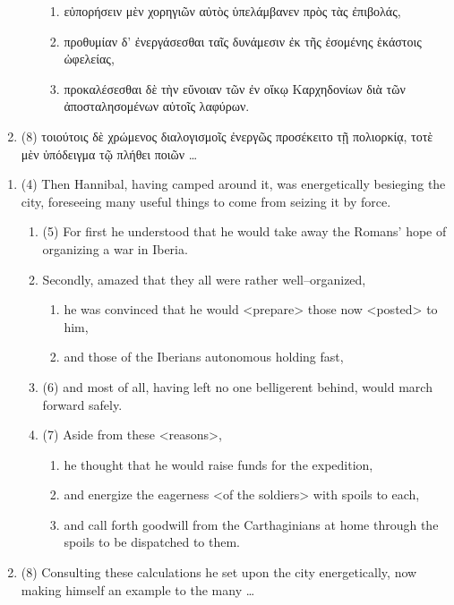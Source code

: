 \documentclass[12pt,letterpaper,oneside,final]{memoir}
\begin{document}
\begin{greek}
\begin{enumerate}
\begin{enumerate}
    \begin{enumerate}
    \item εὐπορήσειν μὲν χορηγιῶν αὐτὸς ὑπελάμβανεν πρὸς τὰς ἐπιβολάς, 
    \item προθυμίαν δ' ἐνεργάσεσθαι ταῖς δυνάμεσιν ἐκ τῆς ἐσομένης ἑκάστοις ὠφελείας, 
    \item προκαλέσεσθαι δὲ τὴν εὔνοιαν τῶν ἐν οἴκῳ Καρχηδονίων διὰ τῶν ἀποσταλησομένων αὐτοῖς λαφύρων. 
    \end{enumerate}
  \end{enumerate}
\item (8) τοιούτοις δὲ χρώμενος διαλογισμοῖς ἐνεργῶς προσέκειτο τῇ πολιορκίᾳ, τοτὲ μὲν ὑπόδειγμα τῷ πλήθει ποιῶν \ldots{}
\end{enumerate} \DoubleSpacing  \end{greek} \begin{enumerate} \SingleSpacing 
\item (4) Then Hannibal, having camped around it, was energetically besieging the city, foreseeing many useful things to come from seizing it by force. 
  \begin{enumerate}
  \item (5) For first he understood that he would take away the Romans' hope of organizing a war in Iberia.
  \item Secondly, amazed that they all were rather well--organized,
    \begin{enumerate}
    \item he was convinced that he would <prepare> those now <posted> to him,
    \item and those of the Iberians autonomous holding fast,
    \end{enumerate}
  \item (6) and most of all, having left no one belligerent behind, would march forward safely. 
  \item (7) Aside from these <reasons>,
    \begin{enumerate}
    \item  he thought that he would raise funds for the expedition,
    \item and energize the eagerness <of the soldiers> with spoils to each,
    \item and call forth goodwill from the Carthaginians at home through the spoils to be dispatched to them. 
    \end{enumerate}
  \end{enumerate}
\item (8) Consulting these calculations he set upon the city energetically, now making himself an example to the many \ldots{}

\end{enumerate}
\end{document}
